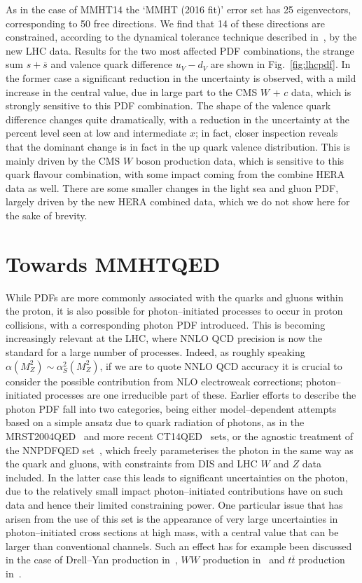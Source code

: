 \documentclass{appolb}
\begin{document}
As in the case of MMHT14 the `MMHT (2016 fit)' error set has 25 eigenvectors, corresponding to 50 free directions. We find that 14 of these directions are constrained, according to the dynamical tolerance technique described in~\cite{Martin:2009iq}, by the new LHC data. Results for the two most affected PDF combinations, the strange sum $s+\overline{s}$ and valence quark difference $u_V-d_V$ are shown in Fig.~\ref{fig:lhcpdf}. In the former case a significant reduction in the uncertainty is observed, with a mild increase in the central value, due in large part to the CMS $W$ + $c$ data, which is strongly sensitive to this PDF combination. The shape of the valence quark difference changes quite dramatically, with a reduction in the uncertainty at the percent level seen at low and intermediate $x$;  in fact, closer inspection reveals that the dominant change is in fact in the up quark valence distribution. This is mainly driven by the CMS $W$ boson production data, which is sensitive to this quark flavour combination, with some impact coming from the combine HERA data as well. There are some smaller changes in the light sea and gluon PDF, largely driven by the new HERA combined data, which we do not show here for the sake of brevity.



\section{Towards MMHTQED}

While PDFs are more commonly associated with the quarks and gluons within the proton, it is also possible for photon--initiated processes to occur in proton collisions, with a corresponding photon PDF introduced. This is becoming increasingly relevant at the LHC, where NNLO QCD precision is now the standard for a large number of processes. Indeed, as roughly speaking $\alpha(M_Z^2)\sim \alpha_S^2(M_Z^2)$, if we are to quote NNLO QCD accuracy it is crucial to consider the possible contribution from NLO electroweak corrections; photon--initiated processes are one irreducible part of these. Earlier efforts to describe the photon PDF fall into two categories, being either model--dependent attempts based on a simple ansatz due to quark radiation of photons, as in the MRST2004QED~\cite{Martin:2004dh} and more recent CT14QED~\cite{Schmidt:2015zda} sets, or the agnostic treatment of the NNPDFQED set~\cite{Ball:2013hta}, which freely parameterises the photon in the same way as the quark and gluons, with constraints from DIS and LHC $W$ and $Z$ data included. In the latter case this leads to significant uncertainties on the photon, due to the relatively small impact photon--initiated contributions have on such data and hence their limited constraining power. One particular issue that has arisen from the use of this set is the appearance of very large uncertainties in photon--initiated cross sections at high mass, with a central value that can be larger than conventional channels. Such an effect has for example been  discussed in the case of Drell--Yan production in~\cite{Bourilkov:2016qum,Accomando:2016tah,Mangano:2016jyj}, $WW$ production in~\cite{Mangano:2016jyj} and $t\overline{t}$ production in~\cite{Pagani:2016caq}.
\end{document}
